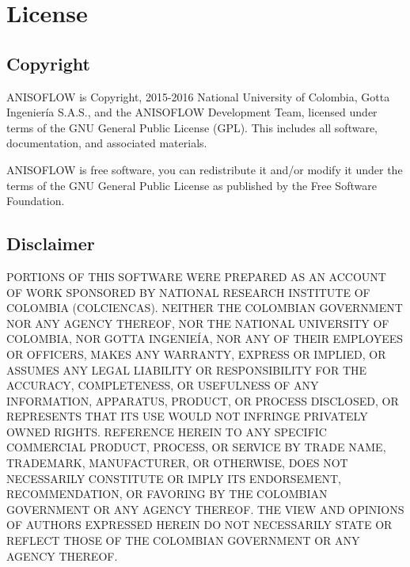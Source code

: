 \chapter{License}

\section{Copyright}
ANISOFLOW is Copyright, 2015-2016 National University of Colombia, Gotta Ingenier\'ia S.A.S., and the ANISOFLOW Development Team, licensed under terms of the GNU General Public License (GPL). This includes all software, documentation, and associated materials.

ANISOFLOW is free software, you can redistribute it and/or modify it under the terms of the GNU General Public License as published by the Free Software Foundation.

\section{Disclaimer}

PORTIONS OF THIS SOFTWARE WERE PREPARED AS AN ACCOUNT OF WORK SPONSORED BY NATIONAL RESEARCH INSTITUTE OF COLOMBIA (COLCIENCAS). NEITHER THE COLOMBIAN GOVERNMENT NOR ANY AGENCY THEREOF, NOR THE NATIONAL UNIVERSITY OF COLOMBIA, NOR GOTTA INGENIE\'IA, NOR ANY OF THEIR EMPLOYEES OR OFFICERS, MAKES ANY WARRANTY, EXPRESS OR IMPLIED, OR ASSUMES ANY LEGAL LIABILITY OR RESPONSIBILITY FOR THE ACCURACY, COMPLETENESS, OR USEFULNESS OF ANY INFORMATION, APPARATUS, PRODUCT, OR PROCESS DISCLOSED, OR REPRESENTS THAT ITS USE WOULD NOT INFRINGE PRIVATELY OWNED RIGHTS. REFERENCE HEREIN TO ANY SPECIFIC COMMERCIAL PRODUCT, PROCESS, OR SERVICE BY TRADE NAME, TRADEMARK, MANUFACTURER, OR OTHERWISE, DOES NOT NECESSARILY CONSTITUTE OR IMPLY ITS ENDORSEMENT, RECOMMENDATION, OR FAVORING BY THE COLOMBIAN GOVERNMENT OR ANY AGENCY THEREOF. THE VIEW AND OPINIONS OF AUTHORS EXPRESSED HEREIN DO NOT NECESSARILY STATE OR REFLECT THOSE OF THE COLOMBIAN GOVERNMENT OR ANY AGENCY THEREOF.